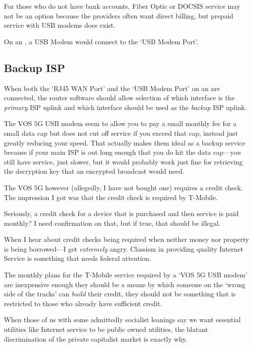 For those who do not have bank accounts, Fiber Optic or DOCSIS service may not be an option because the
providers often want direct billing, but prepaid service with USB modems does exist.

On an , a USB Modem would connect to the `USB Modem Port'.

\subsection{Backup ISP}

When both the `RJ45 WAN Port' and the `USB Modem Port' on an  are connected, the
router software should allow selection of which interface is the \emph{primary} ISP uplink and which interface
should be used as the \emph{backup} ISP uplink.

The VOS 5G USB modem seem to allow you to pay a small monthly fee for a small data cap but does
not cut off service if you exceed that cap, instead just greatly reducing your speed. That actually makes
them ideal as a backup service because if your main ISP is out long enough that you do hit the data cap---you
still have service, just slower, but it would probably work just fine for retrieving the decryption key
that an encrypted  broadcast would need.

The VOS 5G however (allegedly, I have not bought one) requires a credit check. The impression I got was
that the credit check is required by T-Mobile.

Seriously, a credit check for a device that is purchased and then service is paid monthly? I need confirmation
on that, but if true, that should be illegal.

When I hear about credit checks being required when neither money nor property is being borrowed---I get
\emph{extremely} angry. Classism in providing quality Internet Service is something that needs federal
attention.

The monthly plans for the T-Mobile service required by a `VOS 5G USB modem' are inexpensive enough they
should be a means by which someone on the `wrong side of the tracks' can \emph{build} their credit, they
should not be something that is restricted to those who already have sufficient credit.

When those of us with some admittedly socialist leanings say we want essential utilities like Internet
service to be public owned utilities, the blatant discrimination of the private capitalist market is
exactly why.

